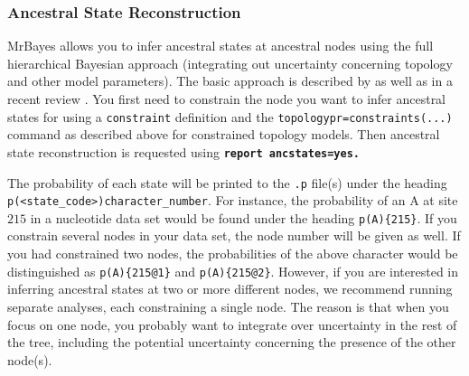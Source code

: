 \documentclass[12pt]{book}
\newcommand{\ttt}[1]{\texttt{#1}}
\newcommand{\tb}[1]{\ttt{\textbf{#1}}}
\begin{document}

\subsubsection{Ancestral State Reconstruction}
MrBayes allows you to infer ancestral states at ancestral nodes using the full hierarchical
Bayesian approach (integrating out uncertainty concerning topology and other model parameters). The
basic approach is described by \citet{huelsenbeck01a} as well as in a recent review
\citep{ronquist04a}. You first need to constrain the node you want to infer ancestral states for
using a \ttt{constraint} definition and the \ttt{topologypr=constraints(...)} command as described
above for constrained topology models. Then ancestral state reconstruction is requested using
\tb{report ancstates=yes.}

The probability of each state will be printed to the \ttt{.p} file(s) under the heading
\ttt{p(<state\_code>){character\_number}}. For instance, the probability of an A at site $215$ in a
nucleotide data set would be found under the heading \ttt{p(A)\{215\}}. If you constrain several
nodes in your data set, the node number will be given as well. If you had constrained two nodes,
the probabilities of the above character would be distinguished as \ttt{p(A)\{215@1\}} and
\ttt{p(A)\{215@2\}}. However, if you are interested in inferring ancestral states at two or more
different nodes, we recommend running separate analyses, each constraining a single node. The
reason is that when you focus on one node, you probably want to integrate over uncertainty in the
rest of the tree, including the potential uncertainty concerning the presence of the other node(s).
\end{document}

